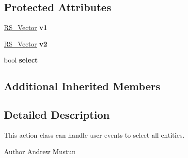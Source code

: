 \subsection*{Protected Attributes}
\begin{DoxyCompactItemize}
\item 
\hypertarget{classRS__ActionSelectWindow_abde96a273a52022ba987aa0d2ccaa7c8}{\hyperlink{classRS__Vector}{R\-S\-\_\-\-Vector} {\bfseries v1}}\label{classRS__ActionSelectWindow_abde96a273a52022ba987aa0d2ccaa7c8}

\item 
\hypertarget{classRS__ActionSelectWindow_a4347314eaeb948c7743f8e89bf49f6fa}{\hyperlink{classRS__Vector}{R\-S\-\_\-\-Vector} {\bfseries v2}}\label{classRS__ActionSelectWindow_a4347314eaeb948c7743f8e89bf49f6fa}

\item 
\hypertarget{classRS__ActionSelectWindow_a50132ebc49043fa9a1a561c9d6df8199}{bool {\bfseries select}}\label{classRS__ActionSelectWindow_a50132ebc49043fa9a1a561c9d6df8199}

\end{DoxyCompactItemize}
\subsection*{Additional Inherited Members}


\subsection{Detailed Description}
This action class can handle user events to select all entities.

\begin{DoxyAuthor}{Author}
Andrew Mustun 
\end{DoxyAuthor}


